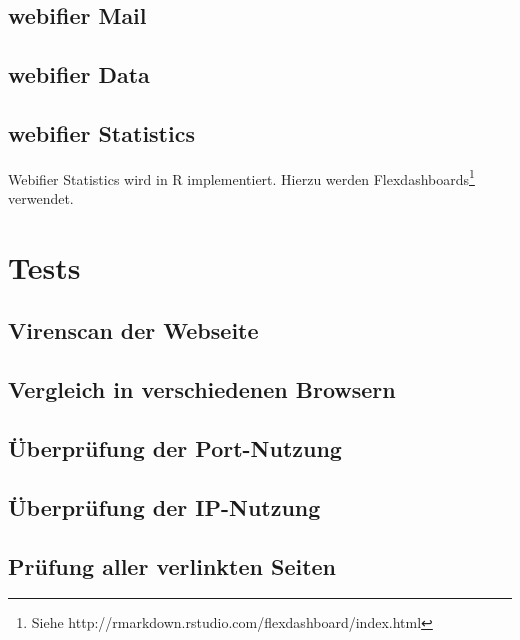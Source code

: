 
\subsection{webifier Mail}


\subsection{webifier Data}


\subsection{webifier Statistics}
Webifier Statistics wird in R implementiert. Hierzu werden Flexdashboards\footnote{Siehe http://rmarkdown.rstudio.com/flexdashboard/index.html} verwendet.

\section{Tests}

\subsection{Virenscan der Webseite}


\subsection{Vergleich in verschiedenen Browsern}


\subsection{Überprüfung der Port-Nutzung}


\subsection{Überprüfung der IP-Nutzung}


\subsection{Prüfung aller verlinkten Seiten}

